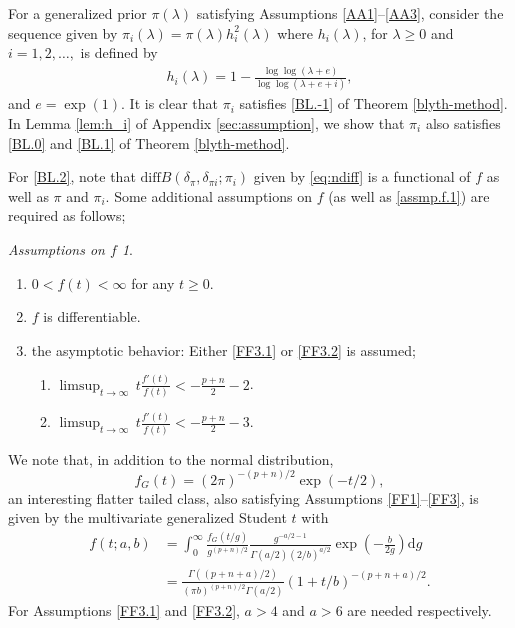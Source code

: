 \documentclass[preprint,11pt]{imsart}
\numberwithin{equation}{section}
\theoremstyle{plain}
\theoremstyle{definition}
\theoremstyle{remark}
\newtheorem*{assumptionf}{Assumptions on $f$}%
\newcommand{\rd}{\mathrm{d}}
\newcommand{\ndiff}{\mathrm{diff}B}
\newcommand{\dps}{\displaystyle}
\begin{document}
For a generalized prior $\pi(\lambda)$ satisfying Assumptions \ref{AA1}--\ref{AA3},
consider the sequence given by $\pi_i(\lambda)=\pi(\lambda)h_i^2(\lambda)$ where 
$h_i(\lambda)$, for $\lambda\geq 0$ and $i=1,2,\dots,$ 
is defined by
\begin{align}\label{eq:new_hir}
 h_i(\lambda)=1-\frac{\log\log(\lambda +e)}{\log\log(\lambda +e+i)},
\end{align}
and $e=\exp(1)$. 
It is clear that  $\pi_i$ satisfies \ref{BL.-1} of Theorem \ref{blyth-method}.
In Lemma \ref{lem:h_i} of  Appendix \ref{sec:assumption}, we show that
$\pi_i$ also satisfies \ref{BL.0} and \ref{BL.1} of Theorem \ref{blyth-method}.

For \ref{BL.2}, note that $\ndiff(\delta_\pi,\delta_{\pi i};\pi_i)$ given by \eqref{eq:ndiff}
is a functional of $f$ as well as $\pi$ and $\pi_i$.
Some additional assumptions on $f$ (as well as \eqref{assmp.f.1}) are required as follows;
\begin{assumptionf}\mbox{}
 \begin{enumerate}[label= F.\arabic*]
  \item \label{FF1} 
	$0<f(t)<\infty$ for any $t\geq 0$.
  \item \label{FF2} $f$ is differentiable.
  \item \label{FF3} the asymptotic behavior:
Either \ref{FF3.1} or \ref{FF3.2} is assumed;
\begin{enumerate}[label= F.3.\arabic*]
 \item \label{FF3.1} $\dps  \limsup_{t\to\infty}\, t\frac{f'(t)}{f(t)}<-\frac{p+n}{2}-2$.
 \item \label{FF3.2}  $\dps  \limsup_{t\to\infty}\, t\frac{f'(t)}{f(t)}<-\frac{p+n}{2}-3$.
 \end{enumerate}
 \end{enumerate}
\end{assumptionf}
We note that, in addition to the normal distribution,
\begin{equation*}
 f_G(t)=(2\pi)^{-(p+n)/2}\exp(-t/2),
\end{equation*}
an interesting flatter tailed class, also
satisfying Assumptions \ref{FF1}--\ref{FF3},
is given by the multivariate generalized Student $t$ with 
\begin{align*}
f(t;a,b) 
&=\int_0^\infty\frac{f_G(t/g)}{g^{(p+n)/2}}
 \frac{g^{-a/2-1}}{\Gamma(a/2)(2/b)^{a/2}}\exp\left(-\frac{b}{2g}\right)\rd g \\
 &=\frac{\Gamma((p+n+a)/2)}{(\pi b)^{(p+n)/2}\Gamma(a/2)}
(1+t/b)^{-(p+n+a)/2}.
\end{align*}
For Assumptions \ref{FF3.1} and \ref{FF3.2}, $a>4$ and $a>6$ are needed respectively.
\end{document}
